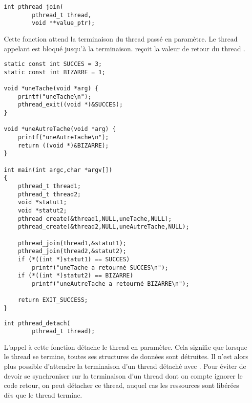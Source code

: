 \label{func:pthread_join}

\begin{lstlisting}
int pthread_join(
		pthread_t thread,
		void **value_ptr);
\end{lstlisting}

Cette fonction attend la terminaison du thread passé en paramètre. Le thread appelant est bloqué jusqu'à la terminaison.  reçoit la valeur de retour du thread .

\begin{lstlisting}[frame=trBL]
static const int SUCCES = 3;
static const int BIZARRE = 1;

void *uneTache(void *arg) {
	printf("uneTache\n");
	pthread_exit((void *)&SUCCES);
}

void *uneAutreTache(void *arg) {
	printf("uneAutreTache\n");
	return ((void *)&BIZARRE);
}

int main(int argc,char *argv[])
{
	pthread_t thread1;
	pthread_t thread2;
	void *statut1;
	void *statut2;
	pthread_create(&thread1,NULL,uneTache,NULL);
	pthread_create(&thread2,NULL,uneAutreTache,NULL);

	pthread_join(thread1,&statut1);
	pthread_join(thread2,&statut2);
	if (*((int *)statut1) == SUCCES)
		printf("uneTache a retourné SUCCES\n");
	if (*((int *)statut2) == BIZARRE)
		printf("uneAutreTache a retourné BIZARRE\n");

	return EXIT_SUCCESS;
}
\end{lstlisting}

\label{func:pthread_detach}

\begin{lstlisting}
int pthread_detach(
		pthread_t thread);
\end{lstlisting}

L'appel à cette fonction détache le thread en paramètre. Cela signifie que lorsque le thread se termine, toutes ses structures de données sont détruites. Il n'est alors plus possible d'attendre la terminaison d'un thread détaché avec . Pour éviter de devoir se synchroniser sur la terminaison d'un thread dont on compte ignorer le code retour, on peut détacher ce thread, auquel cas les ressources sont libérées dès que le thread termine.

